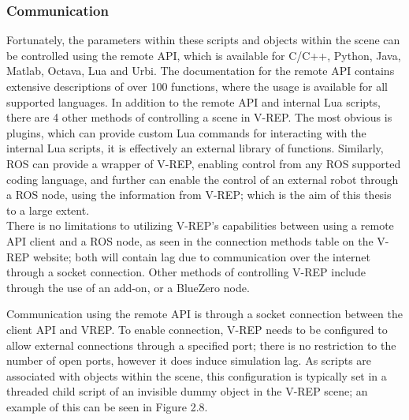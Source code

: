 \documentclass[12pt,openany,a4paper]{book}
\begin{document}
\subsubsection{Communication}
Fortunately, the parameters within these scripts and objects within the scene can be controlled using the remote API, which is available for C/C++, Python, Java, Matlab, Octava, Lua and Urbi. The documentation for the remote API contains extensive descriptions of over 100 functions, where the usage is available for all supported languages. In addition to the remote API and internal Lua scripts, there are 4 other methods of controlling a scene in V-REP. The most obvious is plugins, which can provide custom Lua commands for interacting with the internal Lua scripts, it is effectively an external library of functions. Similarly, ROS can provide a wrapper of V-REP, enabling control from any ROS supported coding language, and further can enable the control of an external robot through a ROS node, using the information from V-REP; which is the aim of this thesis to a large extent.\\
There is no limitations to utilizing V-REP's capabilities between using a remote API client and a ROS node, as seen in the connection methods table on the V-REP website; both will contain lag due to communication over the internet through a socket connection. Other methods of controlling V-REP include through the use of an add-on, or a BlueZero node.

Communication using the remote API is through a socket connection between the client API and VREP. To enable connection, V-REP needs to be configured to allow external connections through a specified port; there is no restriction to the number of open ports, however it does induce simulation lag. As scripts are associated with objects within the scene, this configuration is typically set in a threaded child script of an invisible dummy object in the V-REP scene; an example of this can be seen in Figure 2.8. 
\end{document}

